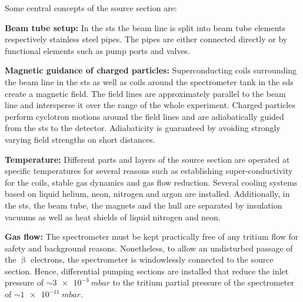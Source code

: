     Some central concepts of the source section are:
    {\par \textbf{Beam tube setup:} In the \gls{sts} the beam line is split into beam tube elements respectively stainless steel pipes. The pipes are either connected directly or by functional elements such as pump ports and valves.}
    
    {\par \textbf{Magnetic guidance of charged particles:} Superconducting coils surrounding the beam line in the \gls{sts} as well as coils around the spectrometer tank in the \gls{sds} create a magnetic field. The field lines are approximately parallel to the beam line and intersperse it over the range of the whole experiment. Charged particles perform cyclotron motions around the field lines and are adiabatically guided from the \gls{sts} to the detector. Adiabaticity is guaranteed by avoiding strongly varying field strengths on short distances.}
    
    {\par \textbf{Temperature:} Different parts and layers of the source section are operated at specific temperatures for several reasons such as establishing super-conductivity for the coils, stable gas dynamics and gas flow reduction. Several cooling systems based on liquid helium, neon, nitrogen and argon are installed. Additionally, in the \gls{sts}, the beam tube, the magnets and the hull are separated by insulation vacuums as well as heat shields of liquid nitrogen and neon.}
    
    {\par \textbf{Gas flow:} The spectrometer must be kept practically free of any tritium flow for safety and background reasons. Nonetheless, to allow an undisturbed passage of the $\upbeta$ electrons, the spectrometer is windowlessly connected to the source section. Hence, differential pumping sections are installed that reduce the inlet pressure of $\sim\SI{3e-3}{mbar}$ to the tritium partial pressure of the spectrometer of $\sim\SI{1e-11}{mbar}$.}
    
